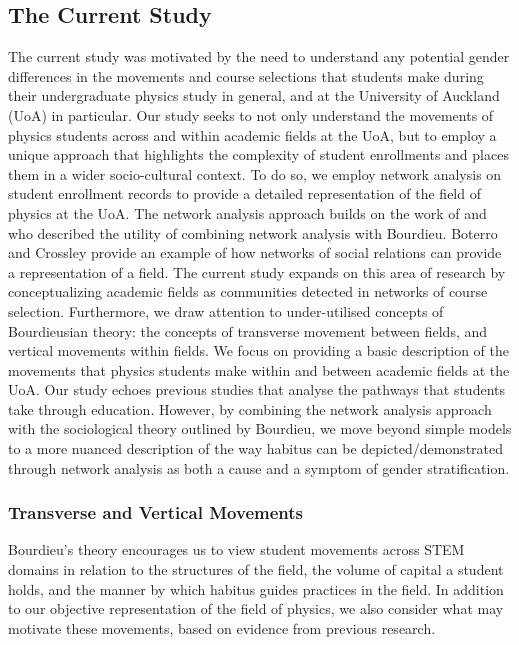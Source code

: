 \subsection{The Current Study}

The current study was motivated by the need to understand any potential gender differences in the movements and course selections that students make during their undergraduate physics study in general, and at the University of Auckland (UoA) in particular. Our study seeks to not only understand the movements of physics students across and within academic fields at the UoA, but to employ a unique approach that highlights the complexity of student enrollments and places them in a wider socio-cultural context. To do so, we employ network analysis on student enrollment records to provide a detailed representation of the field of physics at the UoA. The network analysis approach builds on the work of\cite{de2003fields} and\cite{bottero2011worlds} who described the utility of combining network analysis with Bourdieu. Boterro and Crossley\cite{bottero2011worlds} provide an example of how networks of social relations can provide a representation of a field. The current study expands on this area of research by conceptualizing academic fields as communities detected in networks of course selection. Furthermore, we draw attention to under-utilised concepts of Bourdieusian theory: the concepts of transverse movement between fields, and vertical movements within fields. We focus on providing a basic description of the movements that physics students make within and between academic fields at the UoA. Our study echoes previous studies that analyse the pathways that students take through education. However, by combining the network analysis approach with the sociological theory outlined by Bourdieu\cite{Bourdieu1984}, we move beyond simple models to a more nuanced description of the way habitus can be depicted/demonstrated through network analysis as both a cause and a symptom of gender stratification. 

\subsubsection{Transverse and Vertical Movements}
Bourdieu's theory encourages us to view student movements across STEM domains in relation to the structures of the field, the volume of capital a student holds, and the manner by which habitus guides practices in the field. In addition to our objective representation of the field of physics, we also consider what may motivate these movements, based on evidence from previous research.

